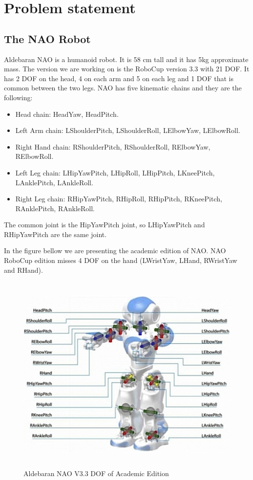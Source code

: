 
\chapter{Problem statement}
\label{problem}

\section{The NAO Robot}
Aldebaran NAO is a humanoid robot. It is 58 cm tall and it has 5kg approximate mass. The version we are working on is the RoboCup version 3.3 with 21 DOF. It has 2 DOF on the head, 4 on each arm and 5 on each leg and 1 DOF that is common between the two legs. NAO has five kinematic chains and they are the following:
\begin{itemize}
\item Head chain: HeadYaw, HeadPitch.
\item Left Arm chain: LShoulderPitch, LShoulderRoll, LElbowYaw, LElbowRoll.
\item Right Hand chain: RShoulderPitch, RShoulderRoll, RElbowYaw, RElbowRoll.
\item Left Leg chain: LHipYawPitch, LHipRoll, LHipPitch, LKneePitch, LAnklePitch, LAnkleRoll.
\item Right Leg chain: RHipYawPitch, RHipRoll, RHipPitch, RKneePitch, RAnklePitch, RAnkleRoll.
\end{itemize}
The common joint is the HipYawPitch joint, so LHipYawPitch and RHipYawPitch are the same joint.

In the figure bellow we are presenting the academic edition of NAO. NAO RoboCup edition misses 4 DOF on the hand (LWristYaw, LHand, RWristYaw and RHand).
\begin{figure}[h]
	\begin{center}
		\includegraphics[height = 10cm]{Figures/nao-robot-dof.jpeg}
 		\caption{Aldebaran NAO V3.3 DOF of Academic Edition}
 		\label{fig:NAO}
	\end{center}
\end{figure}
